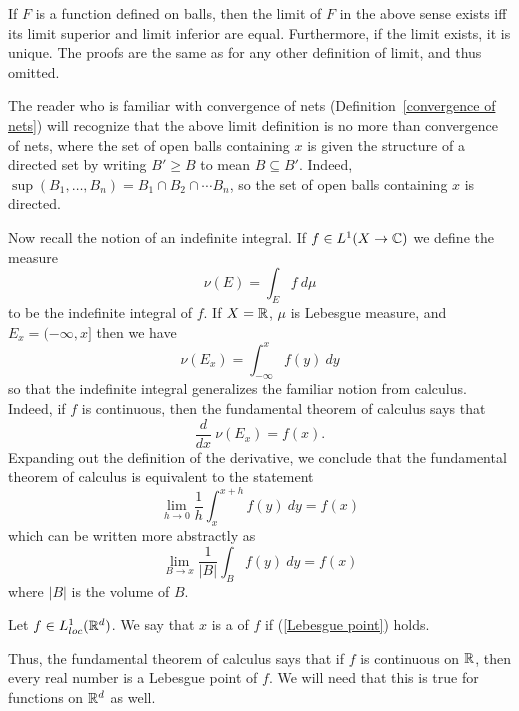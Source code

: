 \begin{subsec}
If $F$ is a function defined on balls, then the limit of $F$ in the above sense exists iff its limit superior and limit inferior are equal.
Furthermore, if the limit exists, it is unique.
The proofs are the same as for any other definition of limit, and thus omitted.
\end{subsec}

\begin{subsec}
The reader who is familiar with convergence of nets (Definition~\ref{convergence of nets}) will recognize that the above limit definition is no more than convergence of nets, where the set of open balls containing $x$ is given the structure of a directed set by writing $B' \geq B$ to mean $B \subseteq B'$.
Indeed, $\sup(B_1, \dots, B_n) = B_1 \cap B_2 \cap \cdots B_n$, so the set of open balls containing $x$ is directed.
\end{subsec}

\begin{subsec}
Now recall the notion of an indefinite integral. If $f \in L^1(X \to \mathbb{C})$ we define the measure
$$\nu(E) = \int_E f ~d\mu$$
to be the indefinite integral of $f$. If $X = \mathbb{R}$, $\mu$ is Lebesgue measure, and $E_x = (-\infty, x]$ then we have
$$\nu(E_x) = \int_{-\infty}^x f(y) ~dy$$
so that the indefinite integral generalizes the familiar notion from calculus.
Indeed, if $f$ is continuous, then the fundamental theorem of calculus says that
$$\frac{d}{dx}~\nu(E_x) = f(x).$$
Expanding out the definition of the derivative, we conclude that the fundamental theorem of calculus is equivalent to the statement
$$\lim_{h \to 0} \frac{1}{h} \int_{x}^{x + h} f(y) ~dy = f(x)$$
which can be written more abstractly as
\begin{equation}
\label{Lebesgue point}
\lim_{B \to x} \frac{1}{|B|} \int_B f(y) ~dy = f(x)
\end{equation}
where $|B|$ is the volume of $B$.
\end{subsec}

\begin{definition}
Let $f \in L^1_{loc}(\mathbb{R}^d)$.
We say that $x$ is a  of $f$ if (\ref{Lebesgue point}) holds.
\end{definition}

\begin{subsec}
Thus, the fundamental theorem of calculus says that if $f$ is continuous on $\mathbb{R}$, then every real number is a Lebesgue point of $f$.
We will need that this is true for functions on $\mathbb{R}^d$ as well.
\end{subsec}

